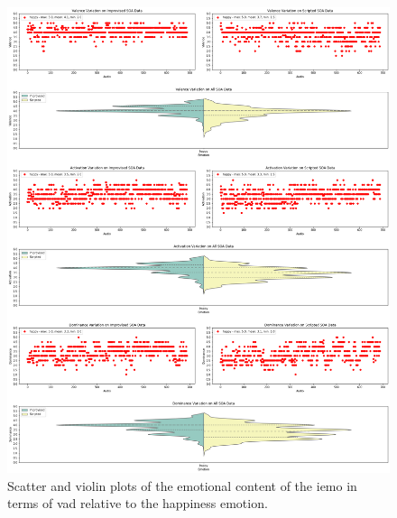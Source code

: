 \begin{figure}[H]
	\centering
	\includegraphics[width=\linewidth]{figs/appendix/IEMOCAP_data_study/happyScatterViolins.png}
	\caption{Scatter and violin plots of the emotional content of the \ac{iemo} in terms of \ac{vad} relative to the happiness emotion.}
\end{figure}


